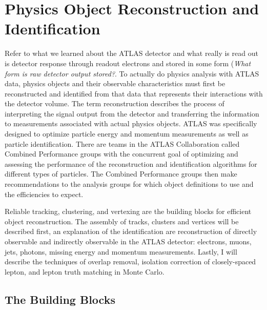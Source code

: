 \chapter{Physics Object Reconstruction and Identification}
\label{ch:obj}
Refer to what we learned about the ATLAS detector and what really is read out is detector response through readout electrons and stored in some form (\textit{What form is raw detector output stored?}.  To actually do physics analysis with ATLAS data, physics objects and their observable characteristics must first be reconstructed and identified from that data that represents their interactions with the detector volume.  The term reconstruction describes the process of interpreting the signal output from the detector and transferring the information to measurements associated with actual physics objects.  ATLAS was specifically designed to optimize particle energy and momentum measurements as well as particle identification. There are teams in the ATLAS Collaboration called Combined Performance groups with the concurrent goal of optimizing and assessing the performance of the reconstruction and identification algorithms for different types of particles.  The Combined Performance groups then make recommendations to the analysis groups for which object definitions to use and the efficiencies to expect.

Reliable tracking, clustering, and vertexing are the building blocks for efficient object reconstruction.  The assembly of tracks, clusters and vertices will be described first, an explanation of the identification are reconstruction of directly observable and indirectly observable in the ATLAS detector: electrons, muons, jets, photons, missing energy and momentum measurements.  Lastly, I will describe the techniques of overlap removal, isolation correction of closely-spaced lepton, and lepton truth matching in Monte Carlo.  

\section{The Building Blocks}

